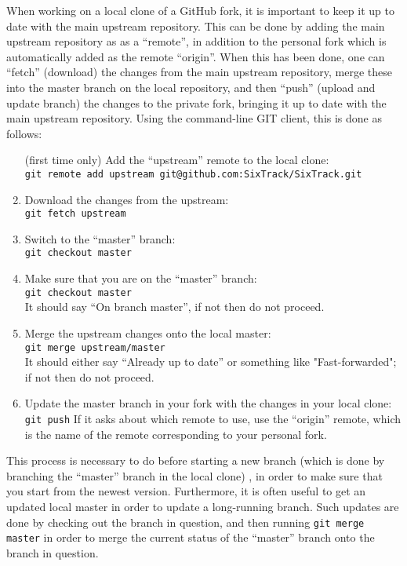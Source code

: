 \documentclass[english,BCOR=0mm,DIV=18]{scrartcl}
\begin{document}
When working on a local clone of a GitHub fork, it is important to keep it up to date with the main upstream repository.
This can be done by adding the main upstream repository as as a ``remote'', in addition to the personal fork which is automatically added as the remote ``origin''.
When this has been done, one can ``fetch'' (download) the changes from the main upstream repository, merge these into the master branch on the local repository, and then ``push'' (upload and update branch) the changes to the private fork, bringing it up to date with the main upstream repository.
Using the command-line GIT client, this is done as follows:
\begin{enumerate}
\item[(first time only)] Add the ``upstream'' remote to the local clone:\\
      \texttt{git remote add upstream git@github.com:SixTrack/SixTrack.git}
\item Download the changes from the upstream:\\
      \texttt{git fetch upstream}
\item Switch to the ``master'' branch:\\
      \texttt{git checkout master}
\item Make sure that you are on the ``master'' branch:\\
      \texttt{git checkout master}\\
      It should say ``On branch master'', if not then do not proceed.
\item Merge the upstream changes onto the local master:\\
      \texttt{git merge upstream/master}\\
      It should either say ``Already up to date'' or something like "Fast-forwarded"; if not then do not proceed.
\item Update the master branch in your fork with the changes in your local clone:
      \texttt{git push}
      If it asks about which remote to use, use the ``origin'' remote, which is the name of the remote corresponding to your personal fork.
\end{enumerate}
This process is necessary to do before starting a new branch (which is done by branching the ``master'' branch in the local clone) , in order to make sure that you start from the newest version.
Furthermore, it is often useful to get an updated local master in order to update a long-running branch.
Such updates are done by checking out the branch in question, and then running \texttt{git merge master} in order to merge the current status of the ``master'' branch onto the branch in question.
\end{document}
